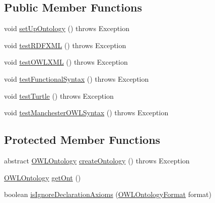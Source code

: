 \subsection*{Public Member Functions}
\begin{DoxyCompactItemize}
\item 
void \hyperlink{classorg_1_1semanticweb_1_1owlapi_1_1api_1_1test_1_1baseclasses_1_1_abstract_round_tripping_test_case_a2962a604568a83d1c539c30e708ff32a}{set\-Up\-Ontology} ()  throws Exception 
\item 
void \hyperlink{classorg_1_1semanticweb_1_1owlapi_1_1api_1_1test_1_1baseclasses_1_1_abstract_round_tripping_test_case_ae3d4df4ac571a7ae0b59ed38d33e5889}{test\-R\-D\-F\-X\-M\-L} ()  throws Exception 
\item 
void \hyperlink{classorg_1_1semanticweb_1_1owlapi_1_1api_1_1test_1_1baseclasses_1_1_abstract_round_tripping_test_case_a941653e02ed6898cdb781a52001fe672}{test\-O\-W\-L\-X\-M\-L} ()  throws Exception 
\item 
void \hyperlink{classorg_1_1semanticweb_1_1owlapi_1_1api_1_1test_1_1baseclasses_1_1_abstract_round_tripping_test_case_aed0f3ed9bb1f5a5fb0bf529cb4afec13}{test\-Functional\-Syntax} ()  throws Exception 
\item 
void \hyperlink{classorg_1_1semanticweb_1_1owlapi_1_1api_1_1test_1_1baseclasses_1_1_abstract_round_tripping_test_case_a9b45a530ee72f7d23ddd4827d9e031a8}{test\-Turtle} ()  throws Exception 
\item 
void \hyperlink{classorg_1_1semanticweb_1_1owlapi_1_1api_1_1test_1_1baseclasses_1_1_abstract_round_tripping_test_case_a85337a28fe33edad29b6f5003d8662f9}{test\-Manchester\-O\-W\-L\-Syntax} ()  throws Exception 
\end{DoxyCompactItemize}
\subsection*{Protected Member Functions}
\begin{DoxyCompactItemize}
\item 
abstract \hyperlink{interfaceorg_1_1semanticweb_1_1owlapi_1_1model_1_1_o_w_l_ontology}{O\-W\-L\-Ontology} \hyperlink{classorg_1_1semanticweb_1_1owlapi_1_1api_1_1test_1_1baseclasses_1_1_abstract_round_tripping_test_case_a6460adb61dca9d09b2dd667ffc0abc00}{create\-Ontology} ()  throws Exception
\item 
\hyperlink{interfaceorg_1_1semanticweb_1_1owlapi_1_1model_1_1_o_w_l_ontology}{O\-W\-L\-Ontology} \hyperlink{classorg_1_1semanticweb_1_1owlapi_1_1api_1_1test_1_1baseclasses_1_1_abstract_round_tripping_test_case_a78952acaf9debf7bfeeaf7f7a9e22d4f}{get\-Ont} ()
\item 
boolean \hyperlink{classorg_1_1semanticweb_1_1owlapi_1_1api_1_1test_1_1baseclasses_1_1_abstract_round_tripping_test_case_a18fe5a8507090d61c3febded145b789e}{is\-Ignore\-Declaration\-Axioms} (\hyperlink{classorg_1_1semanticweb_1_1owlapi_1_1model_1_1_o_w_l_ontology_format}{O\-W\-L\-Ontology\-Format} format)
\end{DoxyCompactItemize}
